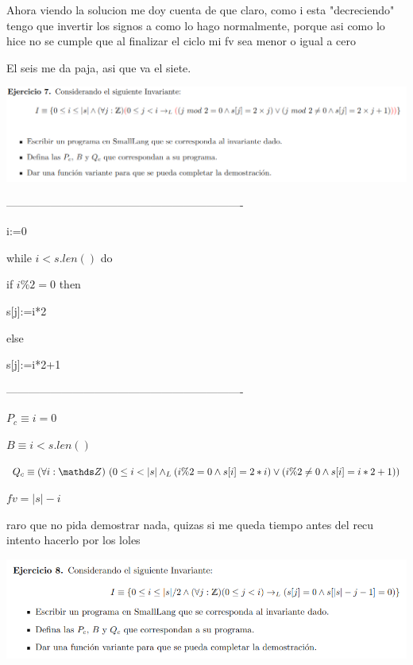 \documentclass[a4paper,10pt]{article}
\begin{document}
    Ahora viendo la solucion me doy cuenta de que claro, como i esta "decreciendo" tengo que invertir los signos a como lo hago normalmente, porque asi como lo hice no se cumple que al finalizar el ciclo mi fv sea menor o igual a cero

    \pagebreak

    El seis me da paja, asi que va el siete.

    \includegraphics*[width=\textwidth]{e7.png}

    ----------------------------------------------------------------

    i:=0

    while $i<s.len()$ do

    \hspace*{3em}if $i\%2=0$ then

    \hspace*{6em}s[j]:=i*2

    \hspace*{3em}else

    \hspace*{6em}s[j]:=i*2+1

    ----------------------------------------------------------------

$P_c\equiv i=0$

$B\equiv i<s.len()$

$Q_c\equiv \paraTodo[unalinea]{i}{\ent}{0\leq i < |s| \land_L (i\%2=0 \land s[i]=2*i)\lor (i\%2\not=0 \land s[i]=i*2+1)}$

$fv=|s|-i$

    raro que no pida demostrar nada, quizas si me queda tiempo antes del recu intento hacerlo por los loles

    \pagebreak

    \includegraphics*[width=\textwidth]{e8.png}
\end{document}

